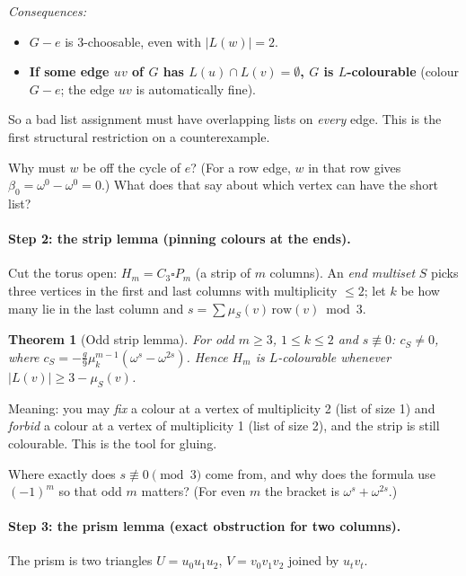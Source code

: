 \documentclass[11pt]{article}
\theoremstyle{plain}
\newtheorem{theorem}{Theorem}[section]
\theoremstyle{definition}
\newcommand{\T}{\square}
\begin{document}
\emph{Consequences:}
\begin{itemize}[nosep]
\item $G-e$ is 3-choosable, even with $|L(w)|=2$.
\item \textbf{If some edge $uv$ of $G$ has $L(u)\cap L(v)=\emptyset$, $G$ is $L$-colourable}
(colour $G-e$; the edge $uv$ is automatically fine).
\end{itemize}
So a bad list assignment must have overlapping lists on \emph{every} edge. This is the
first structural restriction on a counterexample.

\begin{ponder}
Why must $w$ be off the cycle of $e$? (For a row edge, $w$ in that row gives
$\beta_0=\omega^0-\omega^0=0$.) What does that say about which vertex can have the short list?
\end{ponder}

\paragraph{Step 2: the strip lemma (pinning colours at the ends).}
Cut the torus open: $H_m=C_3\T P_m$ (a strip of $m$ columns). An \emph{end multiset} $S$ picks
three vertices in the first and last columns with multiplicity $\le2$; let $k$ be how many
lie in the last column and $s=\sum\mu_S(v)\,\mathrm{row}(v)\bmod3$.

\begin{theorem}[Odd strip lemma]
For odd $m\ge3$, $1\le k\le2$ and $s\not\equiv0$: $c_S\ne0$, where
$c_S=-\tfrac g9\mu_k^{m-1}(\omega^s-\omega^{2s})$. Hence $H_m$ is $L$-colourable whenever
$|L(v)|\ge 3-\mu_S(v)$.
\end{theorem}
Meaning: you may \emph{fix} a colour at a vertex of multiplicity 2 (list of size 1) and
\emph{forbid} a colour at a vertex of multiplicity 1 (list of size 2), and the strip is still
colourable. This is the tool for gluing.

\begin{ponder}
Where exactly does $s\not\equiv0\pmod3$ come from, and why does the formula use
$(-1)^m$ so that odd $m$ matters? (For even $m$ the bracket is $\omega^s+\omega^{2s}$.)
\end{ponder}

\paragraph{Step 3: the prism lemma (exact obstruction for two columns).}
The prism is two triangles $U=u_0u_1u_2$, $V=v_0v_1v_2$ joined by $u_tv_t$.
\end{document}
